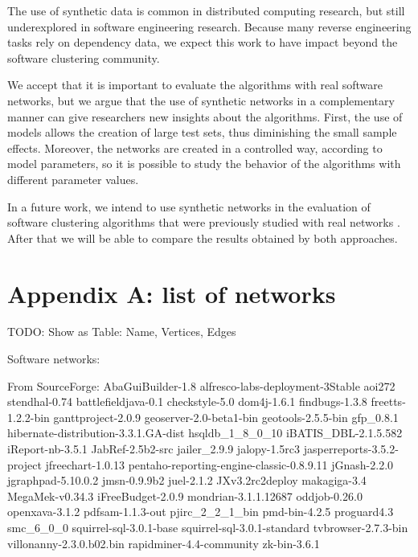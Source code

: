The use of synthetic data is common in distributed computing research, but still
underexplored in software engineering research. Because many reverse engineering
tasks rely on dependency data, we expect this work to have impact beyond the
software clustering community.


We accept that it is important to evaluate the algorithms with real software
networks, but we argue that the use of synthetic networks in a complementary
manner can give researchers new insights about the algorithms. First, the use of
models allows the creation of large test sets, thus diminishing the small sample
effects. Moreover, the networks are created in a controlled way, according to
model parameters, so it is possible to study the behavior of the algorithms with
different parameter values.

In a future work, we intend to use synthetic networks in the evaluation of
software clustering algorithms that were previously studied with real networks
\cite{Wu2005}. After that we will be able to compare the results obtained by
both approaches.

\section{Appendix A: list of networks}

TODO: Show as Table: Name, Vertices, Edges

Software networks:

From SourceForge:
AbaGuiBuilder-1.8
alfresco-labs-deployment-3Stable
aoi272
stendhal-0.74
battlefieldjava-0.1
checkstyle-5.0
dom4j-1.6.1
findbugs-1.3.8
freetts-1.2.2-bin
ganttproject-2.0.9
geoserver-2.0-beta1-bin
geotools-2.5.5-bin
gfp\_0.8.1
hibernate-distribution-3.3.1.GA-dist
hsqldb\_1\_8\_0\_10
iBATIS\_DBL-2.1.5.582
iReport-nb-3.5.1
JabRef-2.5b2-src
jailer\_2.9.9
jalopy-1.5rc3
jasperreports-3.5.2-project
jfreechart-1.0.13
pentaho-reporting-engine-classic-0.8.9.11
jGnash-2.2.0
jgraphpad-5.10.0.2
jmsn-0.9.9b2
juel-2.1.2
JXv3.2rc2deploy
makagiga-3.4
MegaMek-v0.34.3
iFreeBudget-2.0.9
mondrian-3.1.1.12687
oddjob-0.26.0
openxava-3.1.2
pdfsam-1.1.3-out
pjirc\_2\_2\_1\_bin
pmd-bin-4.2.5
proguard4.3
smc\_6\_0\_0
squirrel-sql-3.0.1-base
squirrel-sql-3.0.1-standard
tvbrowser-2.7.3-bin
villonanny-2.3.0.b02.bin
rapidminer-4.4-community
zk-bin-3.6.1

